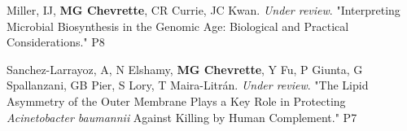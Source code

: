 \begin{cvpubs}


    


  \cvpub
    {Miller, IJ, \textbf{MG Chevrette}, CR Currie, JC Kwan.  \textit{Under review}. "Interpreting Microbial Biosynthesis in the Genomic Age: Biological and Practical Considerations."} %
    {P8} %

  \cvpub
    {Sanchez-Larrayoz, A, N Elshamy, \textbf{MG Chevrette}, Y Fu, P Giunta, G Spallanzani, GB Pier, S Lory, T Maira-Litr\'{a}n.  \textit{Under review}. "The Lipid Asymmetry of the Outer Membrane Plays a Key Role in Protecting \textit{Acinetobacter baumannii} Against Killing by Human Complement."} %
    {P7} %
    

\end{cvpubs}
